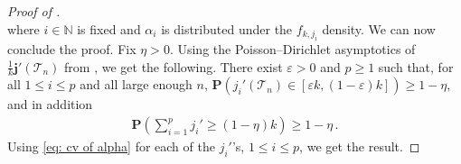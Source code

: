 \documentclass{article}
\theoremstyle{remark}
\newcommand{\bN}{\mathbb{N}}
\newcommand{\cT}{\mathcal{T}}
\newcommand{\bj}{\mathbf{j}}
\newcommand{\prob}[1]{\mathbf{P}{\left(#1\right)}}
\begin{document}
\begin{proof}[Proof of ]
\begin{equation}
\end{equation}
where $i\in\bN$ is fixed and $\alpha_i$ is distributed under the $f_{k,j_i}$ density.
We can now conclude the proof. 
Fix $\eta>0$. 
Using the Poisson--Dirichlet asymptotics of $\frac1k \bj'(\cT_n)$ from , we get the following. 
There exist $\varepsilon>0$ and $p\ge1$ such that, for all $1\le i\le p$ and all large enough $n$, $\prob{j_i'(\cT_n) \in [\varepsilon k, (1-\varepsilon)k]} \geq 1-\eta$, and in addition
\begin{align*}
    \prob{\sum_{i=1}^p j_i' \ge (1-\eta)k} 
    \ge 1-\eta \,.
\end{align*}
Using \eqref{eq: cv of alpha} for each of the $j_i'$'s, $1 \leq i \leq p$, we get the result.
\end{proof}
\end{document}
